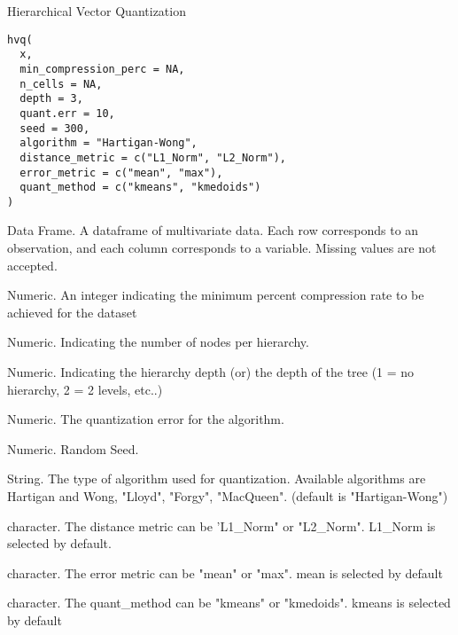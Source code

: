 \documentclass[letterpaper]{book}
\begin{document}
%
\begin{Description}
Hierarchical Vector Quantization
\end{Description}
%
\begin{Usage}
\begin{verbatim}
hvq(
  x,
  min_compression_perc = NA,
  n_cells = NA,
  depth = 3,
  quant.err = 10,
  seed = 300,
  algorithm = "Hartigan-Wong",
  distance_metric = c("L1_Norm", "L2_Norm"),
  error_metric = c("mean", "max"),
  quant_method = c("kmeans", "kmedoids")
)
\end{verbatim}
\end{Usage}
%
\begin{Arguments}
\begin{ldescription}
\item[\code{x}] Data Frame. A dataframe of multivariate data. Each row corresponds to an
observation, and each column corresponds to a variable. Missing values are
not accepted.

\item[\code{min\_compression\_perc}] Numeric. An integer indicating the minimum percent compression rate to
be achieved for the dataset

\item[\code{n\_cells}] Numeric. Indicating the number of nodes per hierarchy.

\item[\code{depth}] Numeric. Indicating the hierarchy depth (or) the depth of the
tree (1 = no hierarchy, 2 = 2 levels, etc..)

\item[\code{quant.err}] Numeric. The quantization error for the algorithm.

\item[\code{seed}] Numeric. Random Seed.

\item[\code{algorithm}] String. The type of algorithm used for quantization.
Available algorithms are Hartigan and Wong, "Lloyd", "Forgy", "MacQueen".
(default is "Hartigan-Wong")

\item[\code{distance\_metric}] character. The distance metric can be 'L1\_Norm" or "L2\_Norm". L1\_Norm is selected by default.

\item[\code{error\_metric}] character. The error metric can be "mean" or "max". mean is selected by default

\item[\code{quant\_method}] character. The quant\_method can be "kmeans" or "kmedoids". kmeans is selected by default
\end{ldescription}
\end{Arguments}
\end{document}
